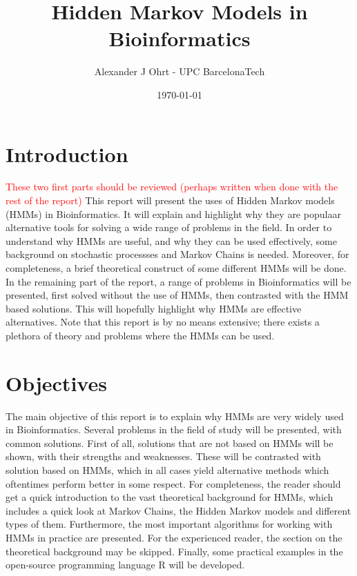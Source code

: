 \documentclass{article}
\title{Hidden Markov Models in Bioinformatics}
\author{Alexander J Ohrt - UPC BarcelonaTech}
\date{\today}
\begin{document}
\maketitle

\tableofcontents

\section{Introduction}
\textcolor{red}{These two first parts should be reviewed (perhaps written when done with the rest of the report)}
This report will present the uses of Hidden Markov models (HMMs) in Bioinformatics. It will explain and highlight why they are populaar alternative tools for solving a wide range of problems in the field. In order to understand why HMMs are useful, and why they can be used effectively, some background on stochastic processses and Markov Chains is needed. Moreover, for completeness, a brief theoretical construct of some different HMMs will be done. In the remaining part of the report, a range of problems in Bioinformatics will be presented, first solved without the use of HMMs, then contrasted with the HMM based solutions. This will hopefully highlight why HMMs are effective alternatives. Note that this report is by no means extensive; there exists a plethora of theory and problems where the HMMs can be used. 

\section{Objectives}

The main objective of this report is to explain why HMMs are very widely used in Bioinformatics. Several problems in the field of study will be presented, with common solutions. First of all, solutions that are not based on HMMs will be shown, with their strengths and weaknesses. These will be contrasted with solution based on HMMs, which in all cases yield alternative methods which oftentimes perform better in some respect. For completeness, the reader should get a quick introduction to the vast theoretical background for HMMs, which includes a quick look at Markov Chains, the Hidden Markov models and different types of them. Furthermore, the most important algorithms for working with HMMs in practice are presented. For the experienced reader, the section on the theoretical background may be skipped. Finally, some practical examples in the open-source programming language R will be developed. 
\end{document}
